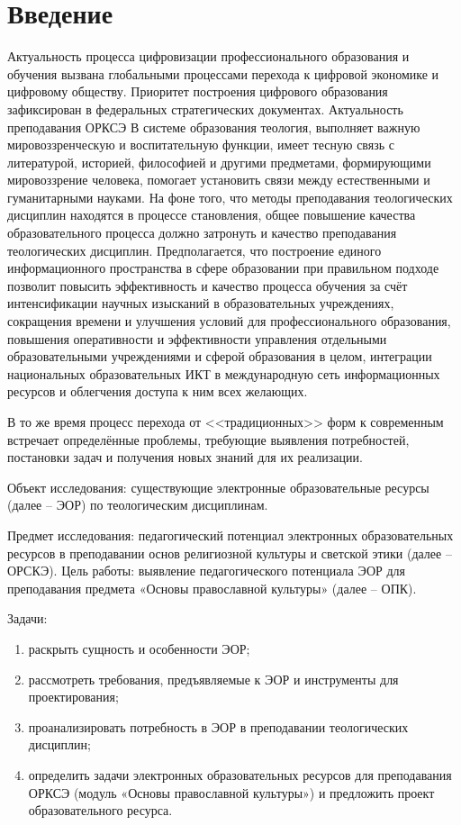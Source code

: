 \tableofcontents
\newpage
\large
\section*{Введение}
Актуальность процесса цифровизации профессионального образования и обучения вызвана глобальными процессами перехода к цифровой экономике и цифровому обществу.
Приоритет построения цифрового образования зафиксирован в федеральных стратегических документах\cite{fsd}. 
Актуальность преподавания ОРКСЭ В системе образования теология, выполняет важную мировоззренческую и воспитательную функции, имеет тесную связь с литературой, историей, философией и другими предметами, формирующими мировоззрение человека, помогает установить связи между естественными и гуманитарными науками.
На фоне того, что методы преподавания теологических дисциплин находятся в процессе становления, общее повышение качества образовательного процесса должно затронуть и качество преподавания теологических дисциплин.
Предполагается, что построение единого информационного пространства в сфере образовании при правильном подходе позволит повысить эффективность и качество процесса обучения за счёт интенсификации научных изысканий в образовательных учреждениях, сокращения времени и улучшения условий для профессионального образования, повышения оперативности и эффективности управления отдельными образовательными учреждениями и сферой образования в целом, интеграции национальных образовательных ИКТ в международную сеть информационных ресурсов и облегчения доступа к ним всех желающих.

В то же время процесс перехода от <<традиционных>> форм к современным встречает определённые проблемы, требующие выявления потребностей, постановки задач и получения новых знаний для их реализации.

Объект исследования: \label{obj} существующие электронные образовательные ресурсы (далее – ЭОР) по теологическим дисциплинам.

Предмет исследования: \label{subj} педагогический потенциал электронных образовательных ресурсов в преподавании основ религиозной культуры и светской этики (далее – ОРСКЭ). 
\newpage
Цель работы:\label{goal}  выявление педагогического потенциала ЭОР для преподавания предмета «Основы православной культуры» (далее – ОПК). 

Задачи:
\begin{enumerate}
\item\label{task1} раскрыть сущность и особенности ЭОР;
\item\label{task2} рассмотреть требования, предъявляемые к ЭОР и инструменты для проектирования; 
\item\label{task3}  проанализировать потребность в ЭОР в преподавании теологических дисциплин;
\item\label{task4}  определить задачи электронных образовательных ресурсов для преподавания ОРКСЭ (модуль «Основы православной культуры») и предложить проект образовательного ресурса.

\end{enumerate}


